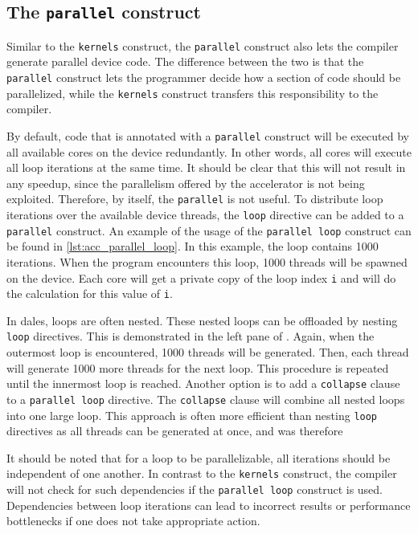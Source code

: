 \subsection{The \texttt{parallel} construct}
Similar to the \texttt{kernels} construct, the \texttt{parallel} construct also lets the compiler generate parallel device code. The difference between the two is that the \texttt{parallel} construct lets the programmer decide how a section of code should be parallelized, while the \texttt{kernels} construct transfers this responsibility to the compiler. 

By default, code that is annotated with a \texttt{parallel} construct will be executed by all available cores on the device redundantly. In other words, all cores will execute all loop iterations at the same time. It should be clear that this will not result in any speedup, since the parallelism offered by the accelerator is not being exploited. Therefore, by itself, the \texttt{parallel} is not useful. To distribute loop iterations over the available device threads, the \texttt{loop} directive can be added to a \texttt{parallel} construct. An example of the usage of the \texttt{parallel loop} construct can be found in \autoref{lst:acc_parallel_loop}. In this example, the loop contains 1000 iterations. When the program encounters this loop, 1000 threads will be spawned on the device. Each core will get a private copy of the loop index \texttt{i} and will do the calculation for this value of \texttt{i}. 

In \acrshort{dales}, loops are often nested. These nested loops can be offloaded by nesting \texttt{loop} directives. This is demonstrated in the left pane of . Again, when the outermost loop is encountered, 1000 threads will be generated. Then, each thread will generate 1000 more threads for the next loop. This procedure is repeated until the innermost loop is reached. Another option is to add a \texttt{collapse} clause to a \texttt{parallel loop} directive. The \texttt{collapse} clause will combine all nested loops into one large loop. This approach is often more efficient than nesting \texttt{loop} directives as all threads can be generated at once, and was therefore 

It should be noted that for a loop to be parallelizable, all iterations should be independent of one another. In contrast to the \texttt{kernels} construct, the compiler will not check for such dependencies if the \texttt{parallel loop} construct is used. Dependencies between loop iterations can lead to incorrect results or performance bottlenecks if one does not take appropriate action. 

